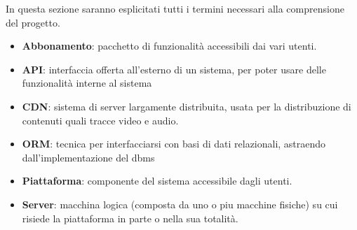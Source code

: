  In questa sezione saranno esplicitati tutti i termini necessari alla comprensione del progetto.

\begin{itemize}
	\item \textbf{Abbonamento}: pacchetto di funzionalità accessibili dai vari utenti.
	\item \textbf{API}: interfaccia offerta all'esterno di un sistema, per poter usare delle funzionalità interne al sistema
	\item \textbf{CDN}: sistema di server largamente distribuita, usata per la distribuzione di contenuti quali tracce video e audio.
	\item \textbf{ORM}: tecnica per interfacciarsi con basi di dati relazionali, astraendo dall'implementazione del dbms
	\item \textbf{Piattaforma}: componente del sistema accessibile dagli utenti.
	\item \textbf{Server}: macchina logica (composta da uno o piu macchine fisiche) su cui risiede la piattaforma in parte o nella sua totalità.
\end{itemize}